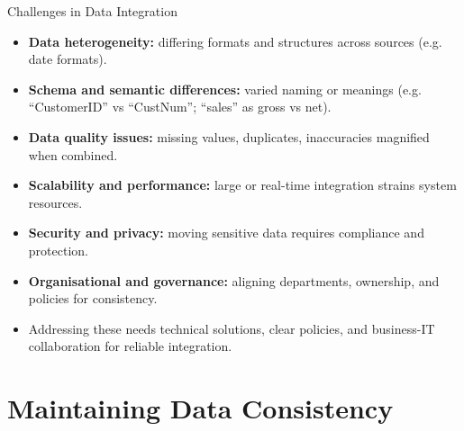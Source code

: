 \documentclass[aspectratio=169, table]{beamer}
\begin{document}
\begin{frame}{Challenges in Data Integration}
	\vspace{20pt}
	
	\begin{itemize}
		\item \textbf{Data heterogeneity:} differing formats and structures across sources (e.g. date formats).
		
		\item \textbf{Schema and semantic differences:} varied naming or meanings (e.g. “CustomerID” vs “CustNum”; “sales” as gross vs net).
		
		\item \textbf{Data quality issues:} missing values, duplicates, inaccuracies magnified when combined.
		
		\item \textbf{Scalability and performance:} large or real-time integration strains system resources.
		
		\item \textbf{Security and privacy:} moving sensitive data requires compliance and protection.
		
		\item \textbf{Organisational and governance:} aligning departments, ownership, and policies for consistency.
		
		\item Addressing these needs technical solutions, clear policies, and business-IT collaboration for reliable integration.
	\end{itemize}
	
\end{frame}

\section{Maintaining Data Consistency}
\end{document}
